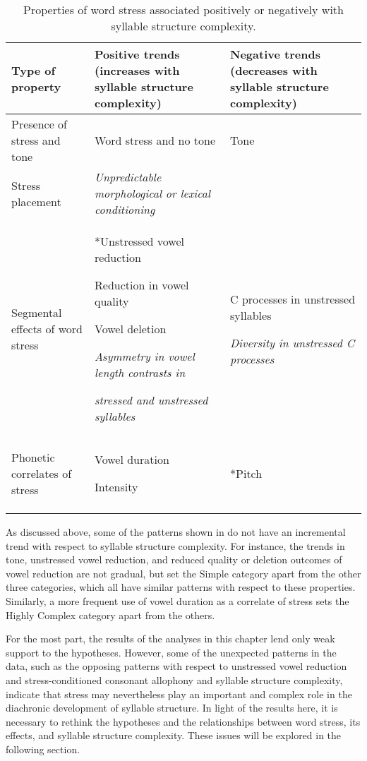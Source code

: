 \begin{table}
\begin{tabularx}{\textwidth}{QQQ}
\lsptoprule
{Type of property}  & {Positive trends} (increases with syllable structure complexity)  & {Negative trends} (decreases with syllable structure complexity)\\\midrule
{Presence of stress and tone} & Word stress and no tone & Tone\\
{Stress placement} & \textit{Unpredictable morphological or lexical conditioning}\\
{Segmental effects of word stress} & *Unstressed vowel reduction

Reduction in vowel quality

Vowel deletion

\textit{Asymmetry in vowel length contrasts in} 

     \textit{stressed and unstressed syllables} & C processes in unstressed syllables

\textit{Diversity in unstressed C processes}\\
{Phonetic correlates of stress} & Vowel duration

Intensity & *Pitch\\
\lspbottomrule
\end{tabularx}
\caption{\label{tab:5.14}Properties of word stress associated positively or negatively with syllable structure complexity.}
\end{table}

  As discussed above, some of the patterns shown in  do not have an incremental trend with respect to syllable structure complexity. For instance, the trends in tone, unstressed vowel reduction, and reduced quality or deletion outcomes of vowel reduction are not gradual, but set the Simple category apart from the other three categories, which all have similar patterns with respect to these properties. Similarly, a more frequent use of vowel duration as a correlate of stress sets the Highly Complex category apart from the others.

  For the most part, the results of the analyses in this chapter lend only weak support to the hypotheses. However, some of the unexpected patterns in the data, such as the opposing patterns with respect to unstressed vowel reduction and stress-conditioned consonant allophony and syllable structure complexity, indicate that stress may nevertheless play an important and complex role in the diachronic development of syllable structure. In light of the results here, it is necessary to rethink the hypotheses and the relationships between word stress, its effects, and syllable structure complexity. These issues will be explored in the following section.

